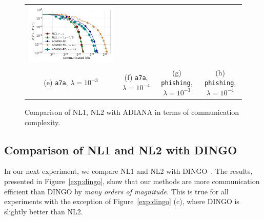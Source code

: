 \documentclass[10pt]{article}
\begin{document}
\begin{figure}[ht]
\begin{center}
{\begin{tabular}{cccc}
				\includegraphics[width = 0.23 \textwidth]{LogReg/phishing/Lambda=1e-4/phishing_nl1_nl2_adiana_lmb=0.0001.pdf}
				\\
				(e) {\tt a7a}, $\lambda=10^{-3}$ &(f) {\tt a7a}, $\lambda=10^{-4}$ & (g) {\tt phishing}, $\lambda=10^{-3}$ &(h) {\tt phishing}, $\lambda=10^{-4}$
		\end{tabular}}
		\caption{Comparison of {\sf NL1}, {\sf NL2} with ADIANA in terms of communication complexity.}
		\label{exp:adiana}
	\end{center}
\end{figure}







\subsection{Comparison of {\sf NL1} and {\sf NL2} with DINGO}

In our next experiment, we compare {\sf NL1} and {\sf NL2} with DINGO~\citep{DINGO2019}. The results, presented  in Figure~\ref{exp:dingo}, show that our methods are more communication efficient than DINGO  by {\em many orders of magnitude.}
This is true for all  experiments with the exception of Figure~\ref{exp:dingo} (c), where DINGO is slightly better than {\sf NL2}. 
\end{document}
